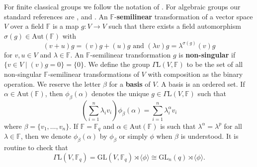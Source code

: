 \documentclass[a4paper,reqno,11pt]{amsart}
\theoremstyle{definition}
\theoremstyle{remark}
\numberwithin{equation}{section}
\newcommand{\Aut}{\mathrm{Aut}}
\newcommand{\GaL}{{\Gamma \mathrm{L}}}
\newcommand{\GL}{{\mathrm{GL}}}
\begin{document}
For finite classical groups we follow the  notation of \cite{kleidlieb}. For algebraic groups our standard references are \cite[Chapter 1]{carter}, \cite[Chapter 1]{gorlyo} and \cite{hump}.
An $\mathbb{F}$-{\bf semilinear} transformation of a vector space $V$ over a field $\mathbb{F}$ is a map $g: V \to V$ such that there exists a field automorphism $\sigma(g) \in \Aut(\mathbb{F})$ with 
$$(v+u)g=(v)g+ (u)g \text{ and } (\lambda v)g= \lambda^{\sigma(g)}(v)g$$
for $v,u \in V$ and $\lambda \in \mathbb{F}.$
An $\mathbb{F}$-semilinear transformation $g$ is {\bf non-singular} if $\{v \in V \mid (v)g=0\}=\{0\}.$ We define the group $\GaL(V,\mathbb{F})$ to be the set of all non-singular $\mathbb{F}$-semilinear transformations of $V$ with composition as the binary operation.   
We reserve the letter $\beta$ for a {\bf basis} of $V$. A basis is an ordered set. 
If $\alpha \in \Aut(\mathbb{F})$, then $\phi_{\beta}(\alpha)$ denotes the unique  $g \in \GaL(V, \mathbb{F})$ such that
\begin{equation}
\label{defphibet}
\left(\sum_{i=1}^n \lambda_i v_i \right) \phi_{\beta}(\alpha)= \sum_{i=1}^n\lambda_i^{\alpha} v_i
\end{equation}
 where $\beta =\{v_1, \ldots, v_n\}.$ If $\mathbb{F}= \mathbb{F}_{q}$ and $\alpha \in \Aut(\mathbb{F})$ is such that $\lambda^{\alpha}=\lambda^p$ for all $\lambda \in \mathbb{F}$,  then we denote $\phi_{\beta}(\alpha)$ by $\phi_{\beta}$ \index{$\phi_{\beta}$} or simply $\phi$ when $\beta$ is understood. It is routine to check that  $$\GaL(V, \mathbb{F}_q)= \GL(V, \mathbb{F}_q) \rtimes \langle \phi \rangle \cong \GL_n(q) \rtimes \langle \phi \rangle.$$


\medskip
\end{document}
